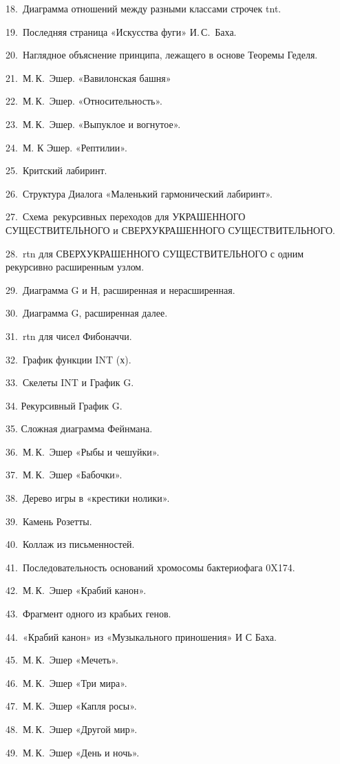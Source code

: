 \documentclass[../main.tex]{subfiles}
\begin{document}
18.~Диаграмма отношений между разными классами строчек \acs{tnt}.

19.~Последняя страница «Искусства фуги» И.\,С.~Баха.

20.~Наглядное объяснение принципа, лежащего в основе Теоремы Геделя.

21.~М.\,К.~Эшер. «Вавилонская башня»

22.~М.\,К.~Эшер. «Относительность».

23.~М.\,К.~Эшер. «Выпуклое и вогнутое».

24.~М. К Эшер. «Рептилии».

25.~Критский лабиринт.

26.~Структура Диалога «Маленький гармонический лабиринт».

27.~Схема~рекурсивных переходов для УКРАШЕННОГО СУЩЕСТВИТЕЛЬНОГО и СВЕРХУКРАШЕННОГО СУЩЕСТВИТЕЛЬНОГО.

28.~\Acs{rtn} для СВЕРХУКРАШЕННОГО СУЩЕСТВИТЕЛЬНОГО с одним рекурсивно расширенным узлом.

29.~Диаграмма G и Н, расширенная и нерасширенная.

30.~Диаграмма G, расширенная далее.

31.~\Acs{rtn} для чисел Фибоначчи.

32.~График функции INT (х).

33.~Скелеты INT и График G.

34. Рекурсивный График G.

35. Сложная диаграмма Фейнмана.

36.~М.\,К.~Эшер «Рыбы и чешуйки».

37.~М.\,К.~Эшер «Бабочки».

38.~Дерево игры в «крестики нолики».

39.~Камень Розетты.

40.~Коллаж из письменностей.

41.~Последовательность оснований хромосомы бактериофага 0X174.

42.~М.\,К.~Эшер «Крабий канон».

43.~Фрагмент одного из крабьих генов.

44.~«Крабий канон» из «Музыкального приношения» И С Баха.

45.~М.\,К.~Эшер «Мечеть».

46.~М.\,К.~Эшер «Три мира».

47.~М.\,К.~Эшер «Капля росы».

48.~М.\,К.~Эшер «Другой мир».

49.~М.\,К.~Эшер «День и ночь».
\end{document}
